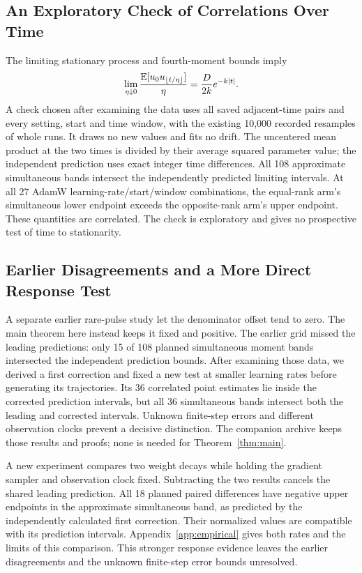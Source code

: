 \subsection{An Exploratory Check of Correlations Over Time}
The limiting stationary process and fourth-moment bounds imply
\[
 \lim_{\eta\downarrow0}
 \frac{\mathbb E[u_0u_{\lfloor t/\eta\rfloor}]}\eta
       =\frac D{2k}e^{-k|t|}.
\]
A check chosen after examining the data uses all saved adjacent-time pairs
and every setting, start and time window, with the existing 10,000 recorded
resamples of whole runs. It draws no new values and fits no drift. The
uncentered mean product at the two times is divided by their average squared parameter value;
the independent prediction uses exact integer time differences.
All 108 approximate simultaneous bands intersect the independently predicted
limiting intervals. At all 27 AdamW learning-rate/start/window combinations,
the equal-rank arm's simultaneous lower endpoint exceeds the opposite-rank
arm's upper endpoint. These quantities are correlated. The check is
exploratory and gives no prospective test of time to stationarity.

\subsection{Earlier Disagreements and a More Direct Response Test}
A separate earlier rare-pulse study let the denominator offset tend to zero.
The main theorem here instead keeps it fixed and positive. The earlier grid
missed the leading predictions: only 15 of 108 planned simultaneous moment
bands intersected the independent prediction bounds. After examining those
data, we derived a first correction and fixed a new test at smaller learning
rates before generating its trajectories. Its 36 correlated point estimates
lie inside the corrected prediction intervals, but all 36 simultaneous bands
intersect both the leading and corrected intervals. Unknown finite-step
errors and different observation clocks prevent a decisive distinction.
The companion archive keeps those results and proofs; none is needed for
Theorem~\ref{thm:main}.

A new experiment compares two weight decays while holding the gradient
sampler and observation clock fixed. Subtracting the two results cancels the
shared leading prediction. All 18 planned paired differences have negative
upper endpoints in the approximate simultaneous band, as predicted by the
independently calculated first correction. Their normalized values are
compatible with its prediction intervals. Appendix~\ref{app:empirical}
gives both rates and the limits of this comparison. This stronger response
evidence leaves the earlier disagreements and the unknown finite-step
error bounds unresolved.

